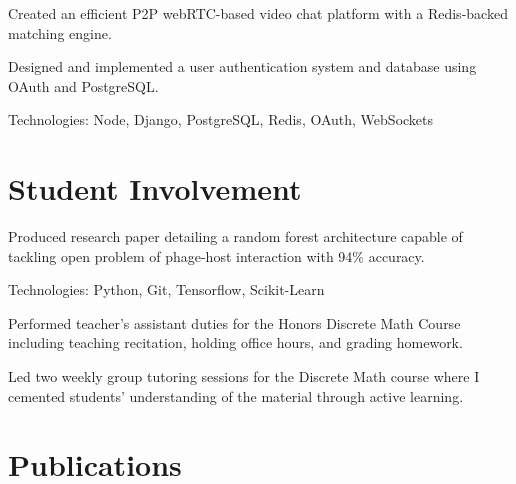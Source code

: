 \documentclass[]{deedy-resume-openfont}
\begin{document}
\begin{minipage}[t]{0.64\textwidth}
\descript{}
\location{}
\begin{tightemize} 
    \item Created an efficient P2P webRTC-based video chat platform  with a Redis-backed 
    matching engine.
    \item Designed and implemented a user authentication system and database using OAuth
    and PostgreSQL.
    \item Technologies: Node, Django, PostgreSQL, Redis, OAuth, WebSockets
\end{tightemize}
\sectionsep

\section{Student Involvement}
\begin{tightemize}
    \item Produced research paper detailing a random forest architecture capable of tackling 
    open problem of phage-host interaction with 94\% accuracy. 
    \item Technologies: Python, Git, Tensorflow, Scikit-Learn
\end{tightemize}
\sectionsep

\descript{}
\begin{tightemize}
    \item Performed teacher's assistant duties for the Honors Discrete Math Course including 
    teaching recitation, holding office hours, and grading homework.
    \item Led two weekly group tutoring sessions for the Discrete Math course where I cemented 
    students' understanding of the material through active learning.
\end{tightemize}
\sectionsep



\section{Publications} 
\renewcommand\refname{\vskip -1.5em} %


\nocite{*}

\end{minipage} 
\end{document}
